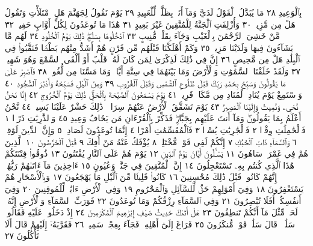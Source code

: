 بِٱلْوَعِيدِ ٢٨ مَا يُبَدَّلُ ٱلْقَوْلُ لَدَيَّ وَمَآ أَنَا۠ بِظَلَّٰمࣲ لِّلْعَبِيدِ ٢٩ يَوْمَ
نَقُولُ لِجَهَنَّمَ هَلِ ٱمْتَلَأْتِ وَتَقُولُ هَلْ مِن مَّزِيدࣲ ٣٠ وَأُزْلِفَتِ ٱلْجَنَّةُ
لِلْمُتَّقِينَ غَيْرَ بَعِيدٍ ٣١ هَٰذَا مَا تُوعَدُونَ لِكُلِّ أَوَّابٍ حَفِيظࣲ ٣٢
مَّنْ خَشِيَ ٱلرَّحْمَٰنَ بِٱلْغَيْبِ وَجَآءَ بِقَلْبࣲ مُّنِيبٍ ٣٣ ٱدْخُلُوهَا
بِسَلَٰمࣲۖ ذَٰلِكَ يَوْمُ ٱلْخُلُودِ ٣٤ لَهُم مَّا يَشَآءُونَ فِيهَا وَلَدَيْنَا مَزِيدࣱ ٣٥
وَكَمْ أَهْلَكْنَا قَبْلَهُم مِّن قَرْنٍ هُمْ أَشَدُّ مِنْهُم بَطْشࣰا فَنَقَّبُوا۟
فِي ٱلْبِلَٰدِ هَلْ مِن مَّحِيصٍ ٣٦ إِنَّ فِي ذَٰلِكَ لَذِكْرَىٰ لِمَن
كَانَ لَهُۥ قَلْبٌ أَوْ أَلْقَى ٱلسَّمْعَ وَهُوَ شَهِيدࣱ ٣٧ وَلَقَدْ خَلَقْنَا
ٱلسَّمَٰوَٰتِ وَٱلْأَرْضَ وَمَا بَيْنَهُمَا فِي سِتَّةِ أَيَّامࣲ وَمَا مَسَّنَا
مِن لُّغُوبࣲ ٣٨ فَٱصْبِرْ عَلَىٰ مَا يَقُولُونَ وَسَبِّحْ بِحَمْدِ رَبِّكَ
قَبْلَ طُلُوعِ ٱلشَّمْسِ وَقَبْلَ ٱلْغُرُوبِ ٣٩ وَمِنَ ٱلَّيْلِ فَسَبِّحْهُ
وَأَدْبَٰرَ ٱلسُّجُودِ ٤٠ وَٱسْتَمِعْ يَوْمَ يُنَادِ ٱلْمُنَادِ مِن مَّكَانࣲ قَرِيبࣲ ٤١
يَوْمَ يَسْمَعُونَ ٱلصَّيْحَةَ بِٱلْحَقِّۚ ذَٰلِكَ يَوْمُ ٱلْخُرُوجِ ٤٢ إِنَّا
نَحْنُ نُحْيِۦ وَنُمِيتُ وَإِلَيْنَا ٱلْمَصِيرُ ٤٣ يَوْمَ تَشَقَّقُ ٱلْأَرْضُ
عَنْهُمْ سِرَاعࣰاۚ ذَٰلِكَ حَشْرٌ عَلَيْنَا يَسِيرࣱ ٤٤ نَّحْنُ أَعْلَمُ بِمَا يَقُولُونَۖ
وَمَآ أَنتَ عَلَيْهِم بِجَبَّارࣲۖ فَذَكِّرْ بِٱلْقُرْءَانِ مَن يَخَافُ وَعِيدِ ٤٥
وَٱلذَّٰرِيَٰتِ ذَرْوࣰا ١ فَٱلْحَٰمِلَٰتِ وِقْرࣰا ٢ فَٱلْجَٰرِيَٰتِ يُسْرࣰا ٣
فَٱلْمُقَسِّمَٰتِ أَمْرًا ٤ إِنَّمَا تُوعَدُونَ لَصَادِقࣱ ٥ وَإِنَّ ٱلدِّينَ لَوَٰقِعࣱ ٦
وَٱلسَّمَآءِ ذَاتِ ٱلْحُبُكِ ٧ إِنَّكُمْ لَفِي قَوْلࣲ مُّخْتَلِفࣲ ٨ يُؤْفَكُ عَنْهُ مَنْ
أُفِكَ ٩ قُتِلَ ٱلْخَرَّٰصُونَ ١٠ ٱلَّذِينَ هُمْ فِي غَمْرَةࣲ سَاهُونَ ١١ يَسْـَٔلُونَ
أَيَّانَ يَوْمُ ٱلدِّينِ ١٢ يَوْمَ هُمْ عَلَى ٱلنَّارِ يُفْتَنُونَ ١٣ ذُوقُوا۟ فِتْنَتَكُمْ هَٰذَا
ٱلَّذِي كُنتُم بِهِۦ تَسْتَعْجِلُونَ ١٤ إِنَّ ٱلْمُتَّقِينَ فِي جَنَّٰتࣲ وَعُيُونٍ ١٥
ءَاخِذِينَ مَآ ءَاتَىٰهُمْ رَبُّهُمْۚ إِنَّهُمْ كَانُوا۟ قَبْلَ ذَٰلِكَ مُحْسِنِينَ ١٦
كَانُوا۟ قَلِيلࣰا مِّنَ ٱلَّيْلِ مَا يَهْجَعُونَ ١٧ وَبِٱلْأَسْحَارِ هُمْ يَسْتَغْفِرُونَ ١٨
وَفِيٓ أَمْوَٰلِهِمْ حَقࣱّ لِّلسَّآئِلِ وَٱلْمَحْرُومِ ١٩ وَفِي ٱلْأَرْضِ ءَايَٰتࣱ
لِّلْمُوقِنِينَ ٢٠ وَفِيٓ أَنفُسِكُمْۚ أَفَلَا تُبْصِرُونَ ٢١ وَفِي ٱلسَّمَآءِ رِزْقُكُمْ
وَمَا تُوعَدُونَ ٢٢ فَوَرَبِّ ٱلسَّمَآءِ وَٱلْأَرْضِ إِنَّهُۥ لَحَقࣱّ مِّثْلَ مَآ أَنَّكُمْ
تَنطِقُونَ ٢٣ هَلْ أَتَىٰكَ حَدِيثُ ضَيْفِ إِبْرَٰهِيمَ ٱلْمُكْرَمِينَ ٢٤ إِذْ
دَخَلُوا۟ عَلَيْهِ فَقَالُوا۟ سَلَٰمࣰاۖ قَالَ سَلَٰمࣱ قَوْمࣱ مُّنكَرُونَ ٢٥ فَرَاغَ إِلَىٰٓ
أَهْلِهِۦ فَجَآءَ بِعِجْلࣲ سَمِينࣲ ٢٦ فَقَرَّبَهُۥٓ إِلَيْهِمْ قَالَ أَلَا تَأْكُلُونَ ٢٧
